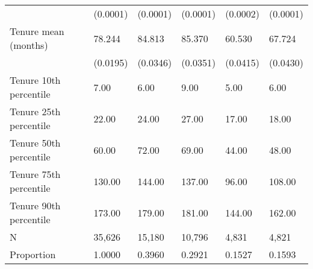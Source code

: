 \begin{tabular}{llllll}
                             &  (0.0001) &  (0.0001) &  (0.0001) &           (0.0002) &         (0.0001) \\
Tenure mean (months)         &    78.244 &    84.813 &    85.370 &             60.530 &           67.724 \\
                             &  (0.0195) &  (0.0346) &  (0.0351) &           (0.0415) &         (0.0430) \\
Tenure 10th percentile       &      7.00 &      6.00 &      9.00 &               5.00 &             6.00 \\
Tenure 25th percentile       &     22.00 &     24.00 &     27.00 &              17.00 &            18.00 \\
Tenure 50th percentile       &     60.00 &     72.00 &     69.00 &              44.00 &            48.00 \\
Tenure 75th percentile       &    130.00 &    144.00 &    137.00 &              96.00 &           108.00 \\
Tenure 90th percentile       &    173.00 &    179.00 &    181.00 &             144.00 &           162.00 \\
N                            &    35,626 &    15,180 &    10,796 &              4,831 &            4,821 \\
Proportion                   &    1.0000 &    0.3960 &    0.2921 &             0.1527 &           0.1593 \\
\bottomrule
\end{tabular}

